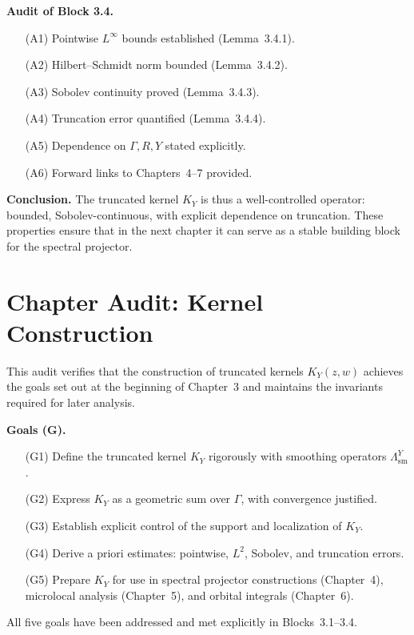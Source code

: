 \medskip

\noindent\textbf{Audit of Block 3.4.}
\begin{itemize}
  \item[(A1)] Pointwise $L^{\infty}$ bounds established (Lemma~3.4.1).
  \item[(A2)] Hilbert–Schmidt norm bounded (Lemma~3.4.2).
  \item[(A3)] Sobolev continuity proved (Lemma~3.4.3).
  \item[(A4)] Truncation error quantified (Lemma~3.4.4).
  \item[(A5)] Dependence on $\Gamma,R,Y$ stated explicitly.
  \item[(A6)] Forward links to Chapters~4–7 provided.
\end{itemize}

\medskip

\noindent\textbf{Conclusion.}
The truncated kernel $K_{Y}$ is thus a well-controlled operator:
bounded, Sobolev-continuous, with explicit dependence on truncation.
These properties ensure that in the next chapter
it can serve as a stable building block for the spectral projector.



\section*{Chapter Audit: Kernel Construction}

\noindent
This audit verifies that the construction of truncated kernels $K_{Y}(z,w)$
achieves the goals set out at the beginning of Chapter~3
and maintains the invariants required for later analysis.

\medskip

\noindent\textbf{Goals (G).}
\begin{itemize}
  \item[(G1)] Define the truncated kernel $K_{Y}$ rigorously with smoothing operators $\Lambda^{Y}_{\mathrm{sm}}$.
  \item[(G2)] Express $K_{Y}$ as a geometric sum over $\Gamma$, with convergence justified.
  \item[(G3)] Establish explicit control of the support and localization of $K_{Y}$.
  \item[(G4)] Derive a priori estimates: pointwise, $L^{2}$, Sobolev, and truncation errors.
  \item[(G5)] Prepare $K_{Y}$ for use in spectral projector constructions (Chapter~4), microlocal analysis (Chapter~5), and orbital integrals (Chapter~6).
\end{itemize}
All five goals have been addressed and met explicitly in Blocks~3.1–3.4.

